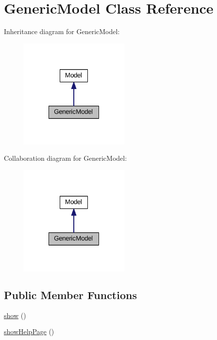 \hypertarget{classGenericModel}{\section{Generic\+Model Class Reference}
\label{classGenericModel}
}


Inheritance diagram for Generic\+Model\+:\nopagebreak
\begin{figure}[H]
\begin{center}
\leavevmode
\includegraphics[width=156pt]{classGenericModel__inherit__graph}
\end{center}
\end{figure}


Collaboration diagram for Generic\+Model\+:\nopagebreak
\begin{figure}[H]
\begin{center}
\leavevmode
\includegraphics[width=156pt]{classGenericModel__coll__graph}
\end{center}
\end{figure}
\subsection*{Public Member Functions}
\begin{DoxyCompactItemize}
\item 
\hyperlink{classGenericModel_a1fea07f39a9346955dff26476dac4650}{show} ()
\item 
\hyperlink{classGenericModel_acd7009f2fcaca1b046b371fe23e0fd2c}{show\+Help\+Page} ()
\end{DoxyCompactItemize}
